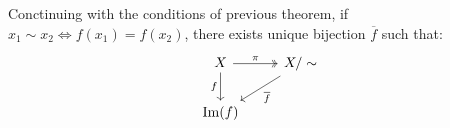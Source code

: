 \begin{theorem}
  \label{theorem equiv2}
  Conctinuing with the conditions of previous theorem, if $x_1 \sim x_2 \Leftrightarrow f(x_1) = f(x_2)$, there exists unique bijection $\overline{f}$ such that:
  \[
    \begin{tikzcd}
      X \arrow[two heads, r, "\pi"] \arrow[d, "f"'] 
      & X / \sim  \arrow[ld, "\overline{f}"]
      \\
      \Im(f)
    \end{tikzcd}
  \]
\end{theorem}